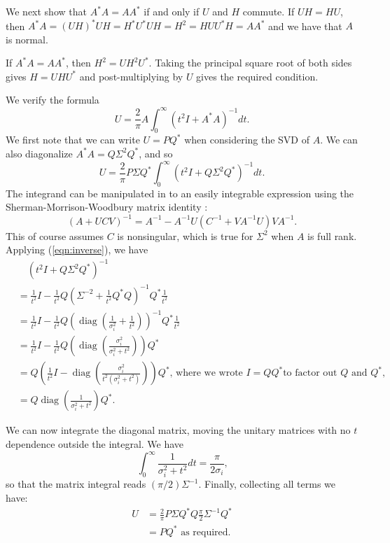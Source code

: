\documentclass[12pt]{article}
\def\diag{\mathop{\mathrm{diag}}}     %
\begin{document}
We next show that $A^*A = AA^*$ if and only if $U$ and $H$ commute.
If $UH=HU$, then $A^*A = (UH)^*UH = H^*U^*UH = H^2 = HUU^*H = AA^*$
and we have that $A$ is normal.

If $A^*A = AA^*$, then $H^2 = UH^2U^*$. Taking the principal square root of
both sides gives $H = UHU^*$ and post-multiplying by $U$ gives the required
condition.

We verify the formula
\begin{equation} \label{eqn:U-integral}
  U = \frac{2}{\pi}A\int_{0}^{\infty}(t^2I + A^*A)^{-1}dt\text{.}
\end{equation}
We first note that we can write $U=PQ^*$ when considering the SVD of $A$. We
can also diagonalize $A^*A = Q\Sigma^2 Q^*$, and so
\begin{equation}
  U = \frac{2}{\pi}P\Sigma Q^*\int_0^{\infty}(t^2I + Q\Sigma^2 Q^*)^{-1}dt\text{.}
\end{equation}
The integrand can be manipulated in to an easily integrable expression using the
Sherman-Morrison-Woodbury matrix identity \cite[p.~258]{high:ASNA2}:
\begin{equation}\label{eqn:inverse}
  (A+UCV)^{-1} = A^{-1} - A^{-1}U(C^{-1} + VA^{-1}U)VA^{-1}\text{.}
\end{equation}
This of course assumes $C$ is nonsingular, which is true for $\Sigma^2$ when $A$
is full rank. Applying (\ref{eqn:inverse}), we have
\begin{align*}
  &\quad (t^2I + Q\Sigma^2Q^*)^{-1} \\
  & = \frac{1}{t^2}I - \frac{1}{t^2}Q(\Sigma^{-2} + \frac{1}{t^2}Q^*Q)^{-1}Q^*\frac{1}{t^2} \\
  & = \frac{1}{t^2}I - \frac{1}{t^2}Q(\diag(\frac{1}{\sigma_i^2}
    + \frac{1}{t^2}))^{-1}Q^*\frac{1}{t^2} \\
  & = \frac{1}{t^2}I - \frac{1}{t^2}Q(\diag(\frac{\sigma_i^2}{\sigma_i^2 + t^2}))Q^* \\
  & = Q(\frac{1}{t^2}I - \diag(\frac{\sigma_i^2}{t^2(\sigma_i^2 + t^2)}))Q^*
    \text{, where we wrote } I = QQ^*
  \text{to factor out } Q\text{ and } Q^*\text{,}\\
  & = Q\diag(\frac{1}{\sigma_i^2 + t^2})Q^*\text{.}
\end{align*}

We can now integrate the diagonal matrix, moving the unitary matrices with no
$t$ dependence outside the integral. We have
\begin{equation}
  \int_0^{\infty}\frac{1}{\sigma_i^2+t^2}dt = \frac{\pi}{2\sigma_i}\text{,}
\end{equation}
so that the matrix integral reads $(\pi /2)\Sigma^{-1}$.
Finally, collecting all terms we have:
\begin{align*}
  U & = \frac{2}{\pi}P\Sigma Q^*Q\frac{\pi}{2}\Sigma^{-1}Q^* \\
    & = PQ^* \text{ as required.}
\end{align*}
\end{document}

